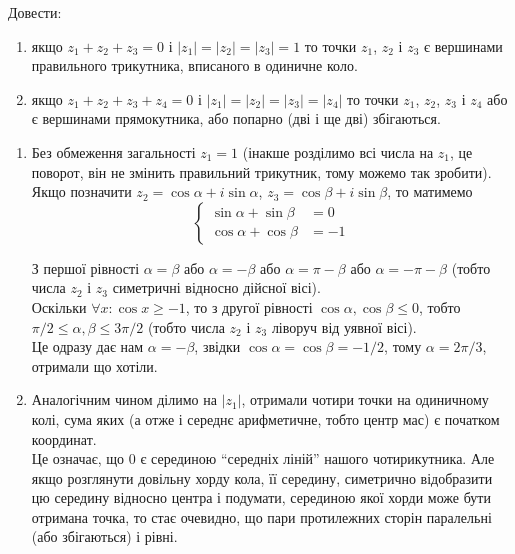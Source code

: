 \begin{problem}[Волковиський, 1.14]
    Довести:
    \begin{enumerate}
        \item якщо $z_1 + z_2 + z_3 = 0$ і $|z_1| = |z_2| = |z_3| = 1$ то точки $z_1$, $z_2$ і $z_3$ є вершинами правильного трикутника, вписаного в одиничне коло.
        \item якщо $z_1 + z_2 + z_3 + z_4= 0$ і $|z_1| = |z_2| = |z_3| = |z_4|$ то точки $z_1$, $z_2$, $z_3$ і $z_4$ або є вершинами прямокутника, або попарно (дві і ще дві) збігаються. 
    \end{enumerate}
\end{problem}

\begin{solution}
    \begin{enumerate}
        \item Без обмеження загальності $z_1 = 1$ (інакше розділимо всі числа на $z_1$, це поворот, він не змінить правильний трикутник, тому можемо так зробити).\\
        
        Якщо позначити $z_2=\cos\alpha+i\sin\alpha$, $z_3=\cos\beta+i\sin\beta$, то матимемо 
        \begin{equation*}
            \left\{
                \begin{split}
                    \sin\alpha+\sin\beta&=0\\
                    \cos\alpha+\cos\beta&=-1
                \end{split}
            \right.
        \end{equation*}
        
        З першої рівності $\alpha = \beta$ або $\alpha = - \beta$ або $\alpha = \pi - \beta$ або $\alpha = -\pi - \beta$ (тобто числа $z_2$ і $z_3$ симетричні відносно дійсної вісі). \\
        
        Оскільки $\forall x: \cos x \ge -1$, то з другої рівності $\cos\alpha,\cos\beta\le0$, тобто $\pi/2\le\alpha, \beta \le3\pi/2$ (тобто числа $z_2$ і $z_3$ ліворуч від уявної вісі). \\
        
        Це одразу дає нам $\alpha=-\beta$, звідки $\cos\alpha = \cos\beta = -1/2$, тому $\alpha=2\pi/3$, отримали що хотіли.
        \item Аналогічним чином ділимо на $|z_1|$, отримали чотири точки на одиничному колі, сума яких (а отже і середнє арифметичне, тобто центр мас) є початком координат.\\
        
        Це означає, що $0$ є серединою ``середніх ліній'' нашого чотирикутника. Але якщо розглянути довільну хорду кола, її середину, симетрично відобразити цю середину відносно центра і подумати, серединою якої хорди може бути отримана точка, то стає очевидно, що пари протилежних сторін паралельні (або збігаються) і рівні.
    \end{enumerate}
\end{solution}
